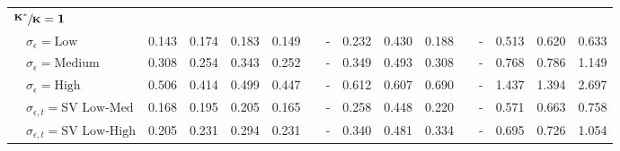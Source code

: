 \begin{table}[!tbp]
\begin{center}
\begin{tabular}{lllllcllllcllll}
\hline
{\bfseries $\mathbf{\sfrac{K^*}{K}=1}$}&&&&&&&&&&&&&&\tabularnewline
~~$\sigma_{\epsilon} =\text{Low}$& 0.143& 0.174& 0.183& 0.149&&-& 0.232& 0.430& 0.188&&-& 0.513& 0.620& 0.633\tabularnewline
~~$\sigma_{\epsilon} =\text{Medium}$& 0.308& 0.254& 0.343& 0.252&&-& 0.349& 0.493& 0.308&&-& 0.768& 0.786& 1.149\tabularnewline
~~$\sigma_{\epsilon} =\text{High}$& 0.506& 0.414& 0.499& 0.447&&-& 0.612& 0.607& 0.690&&-& 1.437& 1.394& 2.697\tabularnewline
~~$\sigma_{\epsilon,t} = \text{SV Low-Med}$& 0.168& 0.195& 0.205& 0.165&&-& 0.258& 0.448& 0.220&&-& 0.571& 0.663& 0.758\tabularnewline
~~$\sigma_{\epsilon,t}  = \text{SV Low-High}$& 0.205& 0.231& 0.294& 0.231&&-& 0.340& 0.481& 0.334&&-& 0.695& 0.726& 1.054\tabularnewline
\hline
\end{tabular}\end{center}
\end{table}
